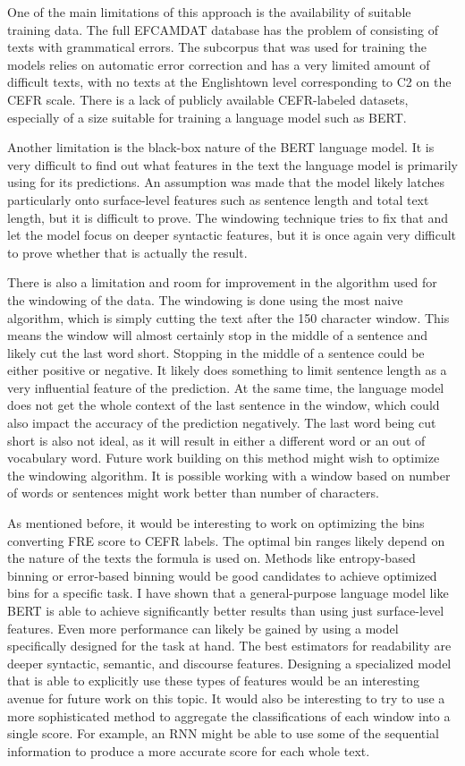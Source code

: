 \documentclass[11pt,a4paper]{article}
\begin{document}
One of the main limitations of this approach is the availability of suitable
training data. The full EFCAMDAT database has the problem of consisting of
texts with grammatical errors. The subcorpus that was used for training the
models relies on automatic error correction and has a very limited amount of
difficult texts, with no texts at the Englishtown level corresponding to C2 on
the CEFR scale. There is a lack of publicly available CEFR-labeled datasets,
especially of a size suitable for training a language model such as BERT.

Another limitation is the black-box nature of the BERT language model. It is
very difficult to find out what features in the text the language model is
primarily using for its predictions. An assumption was made that the model
likely latches particularly onto surface-level features such as sentence length and
total text length, but it is difficult to prove. The windowing technique tries to
fix that and let the model focus on deeper syntactic features, but it is once
again very difficult to prove whether that is actually the result.

There is also a limitation and room for improvement in the algorithm used for
the windowing of the data. The windowing is done using the most naive algorithm,
which is simply cutting the text after the 150 character window. This means the window
will almost certainly stop in the middle of a sentence and likely cut the last word short.
Stopping in the middle of a sentence could be either positive or negative. It likely does
something to limit sentence length as a very influential feature of the prediction. At the same
time, the language model does not get the whole context of the last sentence in the window,
which could also impact the accuracy of the prediction negatively. The last word being cut short
is also not ideal, as it will result in either a different word or an out of vocabulary word.
Future work building on this method might wish to optimize the windowing algorithm. It is possible
working with a window based on number of words or sentences might work better than number
of characters.

As mentioned before, it would be interesting to work on optimizing the bins
converting FRE score to CEFR labels. The optimal bin ranges likely depend on
the nature of the texts the formula is used on. Methods like
entropy-based binning or error-based binning would be good candidates to
achieve optimized bins for a specific task. I have shown that a
general-purpose language model like BERT is able to achieve significantly
better results than using just surface-level features. Even
more performance can likely be gained by using a model specifically designed for
the task at hand. The best estimators for readability are deeper
syntactic, semantic, and discourse features. Designing a specialized model that
is able to explicitly use these types of features would be an interesting
avenue for future work on this topic. It would also be interesting to try to use a more
sophisticated method to aggregate the classifications of each window into a single score.
For example, an RNN might be able to use some of the sequential information to produce
a more accurate score for each whole text.
\end{document}
